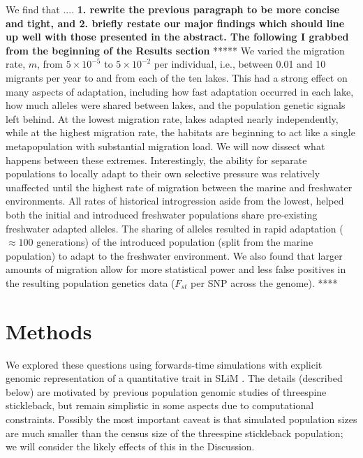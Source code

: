 \documentclass{article}
\newcommand{\plr}[1]{\todo[linecolor=blue,backgroundcolor=blue!25,bordercolor=blue]{#1}}
\begin{document}
We find that .... \textbf{1. rewrite the previous paragraph to be more concise and tight, and 2. briefly restate our major findings which should line up well with those presented in the abstract. The following I grabbed from the beginning of the Results section}
*****
We varied the migration rate, $m$, from $5 \times 10^{-5}$ to $5 \times 10^{-2}$ per individual, i.e., between 0.01 and 10 migrants per year to and from each of the ten lakes. This had a strong effect on many aspects of adaptation, including how fast adaptation occurred in each lake, how much alleles were shared between lakes,
and the population genetic signals left behind. At the lowest migration rate, lakes adapted nearly independently, while at the highest migration rate, the habitats are beginning to act like a single metapopulation with substantial migration load. We will now dissect what happens between these extremes. Interestingly, the ability for separate populations to locally adapt to their own selective pressure was relatively unaffected until the highest rate of migration between the marine and freshwater environments. All rates of historical introgression aside from the lowest, helped both the initial and introduced freshwater populations share pre-existing freshwater adapted alleles. The sharing of alleles resulted in rapid adaptation ($\approx 100$ generations) of the introduced population (split from the marine population) to adapt to the freshwater environment. We also found that larger amounts of migration allow for more statistical power and less false positives in the resulting population genetics data ($F_{st}$ per SNP across the genome).
****


\section{Methods}

We explored these questions using forwards-time simulations with explicit genomic representation of a quantitative trait in SLiM \citep{haller2017slim}. The details (described below) are motivated by previous population genomic studies of threespine stickleback, but remain simplistic in some aspects due to computational constraints.
Possibly the most important caveat is that simulated population sizes are much smaller than the census size of the threespine stickleback population;
we will consider the likely effects of this in the Discussion. \plr{TODO}
\end{document}
